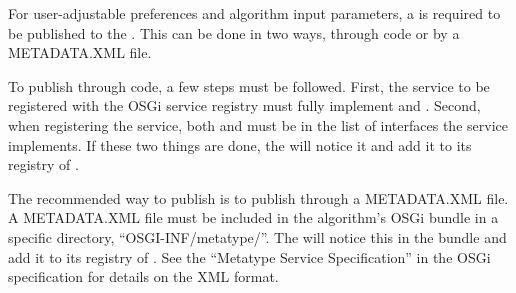 For user-adjustable preferences and algorithm input parameters, a
 is required to be published to the
. This can be done in two ways, through code or by a
METADATA.XML file.

To publish through code, a few steps must be followed. First, the service to be
registered with the OSGi service registry must fully implement
 and
. Second, when
registering the service, both  and 
must be in the list of interfaces the service implements. If these two things are
done, the  will notice it and add it to its registry of
.

The recommended way to publish  is to publish through a
METADATA.XML file. A METADATA.XML file must be included in the algorithm's OSGi
bundle in a specific directory, ``OSGI-INF/metatype/''. The
 will notice this in the bundle and add it to its registry
of . See the ``Metatype Service Specification'' in the
OSGi specification for details on the XML format.
